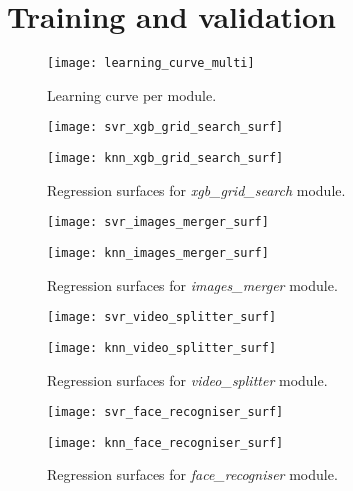 \section{Training and validation}
\begin{figure*}[!t]
	\centering
	\begin{minipage}{0.85\linewidth}
		\texttt{[image: learning\_curve\_multi]}
	\end{minipage}
	\caption{Learning curve per module.}
	\label{fig:curve}
\end{figure*}

\begin{figure*}[!t]
	\centering
	\begin{minipage}{0.45\linewidth}
		\texttt{[image: svr\_xgb\_grid\_search\_surf]}
	\end{minipage}
	\begin{minipage}{0.45\linewidth}
		\texttt{[image: knn\_xgb\_grid\_search\_surf]}
	\end{minipage}
	\caption{Regression surfaces for \textit{xgb\_grid\_search} module.}
	\label{fig:xgb_surf}
\end{figure*}

\begin{figure*}[!t]
	\centering
	\begin{minipage}{0.45\linewidth}
		\texttt{[image: svr\_images\_merger\_surf]}
	\end{minipage}
	\begin{minipage}{0.45\linewidth}
		\texttt{[image: knn\_images\_merger\_surf]}
	\end{minipage}
	\caption{Regression surfaces for \textit{images\_merger} module.}
	\label{fig:images_merger_surf}
\end{figure*}

\begin{figure*}[!t]
	\centering
	\begin{minipage}{0.45\linewidth}
		\texttt{[image: svr\_video\_splitter\_surf]}
	\end{minipage}
	\begin{minipage}{0.45\linewidth}
		\texttt{[image: knn\_video\_splitter\_surf]}
	\end{minipage}
	\caption{Regression surfaces for \textit{video\_splitter} module.}
	\label{fig:video_splitter_surf}
\end{figure*}

\begin{figure*}[!t]
	\centering
	\begin{minipage}{0.45\linewidth}
		\texttt{[image: svr\_face\_recogniser\_surf]}
	\end{minipage}
	\begin{minipage}{0.45\linewidth}
		\texttt{[image: knn\_face\_recogniser\_surf]}
	\end{minipage}
	\caption{Regression surfaces for \textit{face\_recogniser} module.}
	\label{fig:face_recogniser_surf}
\end{figure*}


